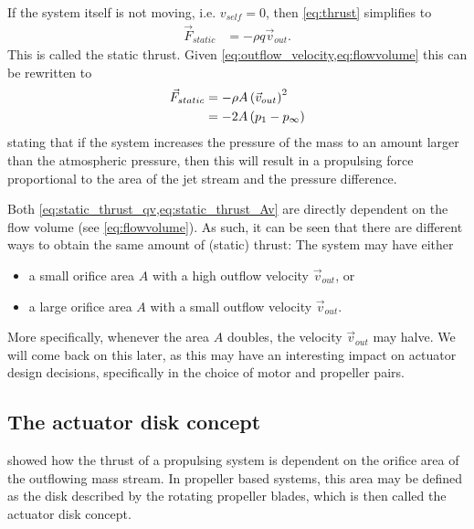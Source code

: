 
If the system itself is not moving, i.e. $v_{self} = 0$, then \cref{eq:thrust} simplifies to
%
\begin{align}
\vec{F}_{static} &= -\rho q \vec{v}_{out}.  \label{eq:static_thrust_qv}
\end{align}
%
This is called the static thrust. %
Given \cref{eq:outflow_velocity,eq:flowvolume} this can be rewritten to
%
\begin{align}
\vec{F}_{static} &= -\rho A \left(\vec{v}_{out}\right)^2 \label{eq:static_thrust_Av} \\
				 &= -2A \left( p_1 - p_\infty \right)
\end{align}
%
stating that if the system increases the pressure of the mass to an amount
larger than the atmospheric pressure, then this will result in a propulsing
force proportional to the area of the jet stream and the pressure difference.

Both \cref{eq:static_thrust_qv,eq:static_thrust_Av} are directly dependent on
the flow volume (see \cref{eq:flowvolume}). As such, it can be seen that there are
different ways to obtain the same amount of (static) thrust: The system may have either

\begin{itemize}
	\item a small orifice area $A$ with a high outflow velocity $\vec{v}_{out}$, or
	\item a large orifice area $A$ with a small outflow velocity $\vec{v}_{out}$.
\end{itemize}

More specifically, whenever the area $A$ doubles, the velocity $\vec{v}_{out}$ may halve. 
We will come back on this later, as this may have an interesting impact on actuator design decisions, specifically in the choice of motor and propeller pairs.


\subsection{The actuator disk concept}

 showed how the thrust of a propulsing system is dependent on the orifice area of the outflowing mass stream. 
In propeller based systems, this area may be defined as the disk described by the rotating propeller blades, which is then called the actuator disk concept.



